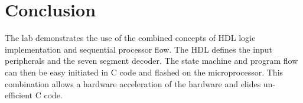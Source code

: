 \section{Conclusion}\label{sec: Conclusion}
The lab demonstrates the use of the combined concepts of HDL logic implementation and sequential processor flow. The HDL defines the input peripherals and the seven segment decoder. The state machine and program flow can then be easy initiated in C code and flashed on the microprocessor. This combination allows a hardware acceleration of the hardware and elides un-efficient C code.


